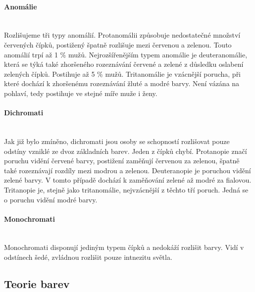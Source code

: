\paragraph{Anomálie}\mbox{}\\
Rozlišujeme tři typy anomálií. Protanomálii způsobuje nedostatečné množství červených čípků, postižený špatně rozlišuje mezi červenou a zelenou. Touto anomálií trpí
až 1 \% mužů. Nejrozšířenějším typem anomálie je deuteranomálie, která se týká také zhoršeného rozeznávání červené a zelené z důsledku oslabení zelených čípků. Postihuje
až 5 \% mužů. Tritanomálie je vzácnější porucha, při které dochází k zhoršenému rozeznávání žluté a modré barvy. Není vázána na pohlaví, tedy postihuje ve stejné míře muže
i ženy.

\paragraph{Dichromati}\mbox{}\\
Jak již bylo zmíněno, dichromati jsou osoby se schopností rozlišovat pouze odstíny vzniklé ze dvoz základních barev. Jeden z čípků chybí. Protanopie značí poruchu vidění
červené barvy, postižení zaměňují červenou za zelenou, špatně také rozeznávají rozdíly mezi modrou a zelenou. Deuteranopie je poruchou vidění zelené barvy. V tomto případě dochází k zaměňování
zelené až modré za fialovou. Tritanopie je, stejně jako tritanomálie, nejvzácnější z těchto tří poruch. Jedná se o poruchu vidění modré barvy.

\paragraph{Monochromati}\mbox{}\\
Monochromati disponují jediným typem čípků a nedokáží rozlišit barvy. Vidí v odstínech šedé, zvládnou rozlišit pouze intnezitu světla.

\subsection{Teorie barev}

